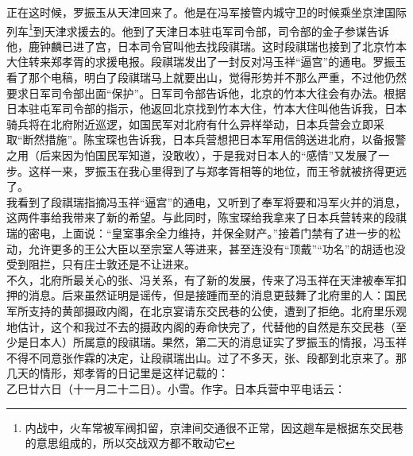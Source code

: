 正在这时候，罗振玉从天津回来了。他是在冯军接管内城守卫的时候乘坐京津国际列车\footnote{内战中，火车常被军阀扣留，京津间交通很不正常，因这趟车是根据东交民巷的意思组成的，所以交战双方都不敢动它}到天津求援去的。他到了天津日本驻屯军司令部，司令部的金子参谋告诉他，鹿钟麟已进了宫，日本司令官叫他去找段祺瑞。这时段祺瑞也接到了北京竹本大住转来郑孝胥的求援电报。段祺瑞发出了一封反对冯玉祥“逼宫”的通电。罗振玉看了那个电稿，明白了段祺瑞马上就要出山，觉得形势并不那么严重，不过他仍然要求日军司令部出面“保护”。日军司令部告诉他，北京的竹本大往会有办法。根据日本驻屯军司令部的指示，他返回北京找到竹本大住，竹本大住叫他告诉我，日本骑兵将在北府附近巡逻，如国民军对北府有什么异样举动，日本兵营会立即采取“断然措施”。陈宝琛也告诉我，日本兵营想把日本军用信鸽送进北府，以备报警之用（后来因为怕国民军知道，没敢收），于是我对日本人的“感情”又发展了一步。这样一来，罗振玉在我心里得到了与郑孝胥相等的地位，而王爷就被挤得更远了。\\

我看到了段祺瑞指摘冯玉祥“逼宫”的通电，又听到了奉军将要和冯军火并的消息，这两件事给我带来了新的希望。与此同时，陈宝琛给我拿来了日本兵营转来的段祺瑞的密电，上面说：“皇室事余全力维持，并保全财产。”接着门禁有了进一步的松动，允许更多的王公大臣以至宗室人等进来，甚至连没有“顶戴”“功名”的胡适也没受到阻拦，只有庄士敦还是不让进来。\\

不久，北府所最关心的张、冯关系，有了新的发展，传来了冯玉祥在天津被奉军扣押的消息。后来虽然证明是谣传，但是接踵而至的消息更鼓舞了北府里的人：国民军所支持的黄部摄政内阁，在北京宴请东交民巷的公使，遭到了拒绝。北府里乐观地估计，这个和我过不去的摄政内阁的寿命快完了，代替他的自然是东交民巷（至少是日本人）所属意的段祺瑞。果然，第二天的消息证实了罗振玉的情报，冯玉祥不得不同意张作霖的决定，让段祺瑞出山。过了不多天，张、段都到北京来了。那几天的情形，郑孝胥的日记里是这样记载的：\\

乙巳廿六日（十一月二十二日）。小雪。作字。日本兵营中平电话云：\\

